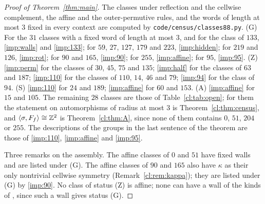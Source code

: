 \begin{proof}[Proof of Theorem~\ref{thm:main}]
The classes under reflection and the cellwise complement, the affine and the outer-permutive rules, and the words of length at most $3$ fixed in every context are computed by \texttt{code/census/classes88.py}. (G) For the $31$ classes with a fixed word of length at most $3$, and for the class of $133$, \eqref{imp:walls} and \eqref{imp:133}; for $59$, $27$, $127$, $179$ and $223$, \eqref{imp:hidden}; for $219$ and $126$, \eqref{imp:rot}; for $90$ and $165$, \eqref{imp:90}; for $255$, \eqref{imp:affine}; for $95$, \eqref{imp:95}. (Z) \eqref{imp:perm} for the classes of $30$, $45$, $75$ and $135$; \eqref{imp:half} for the classes of $63$ and $187$; \eqref{imp:110} for the classes of $110$, $14$, $46$ and $79$; \eqref{imp:94} for the class of $94$. (S) \eqref{imp:110} for $24$ and $189$; \eqref{imp:affine} for $60$ and $153$. (A) \eqref{imp:affine} for $15$ and $105$. The remaining $28$ classes are those of Table~\ref{cl:tab:open}; for them the statement on automorphisms of radius at most $3$ is Theorem~\ref{cl:thm:census}, and $\langle\sigma,F_f\rangle\cong\mathbb{Z}^2$ is Theorem~\ref{cl:thm:A}, since none of them contains $0$, $51$, $204$ or $255$. The descriptions of the groups in the last sentence of the theorem are those of \eqref{imp:110}, \eqref{imp:affine} and \eqref{imp:95}.

Three remarks on the assembly. The affine classes of $0$ and $51$ have fixed walls and are listed under (G). The affine classes of $90$ and $165$ also have $\kappa$ as their only nontrivial cellwise symmetry (Remark~\ref{cl:rem:kappa}); they are listed under (G) by \eqref{imp:90}. No class of status (Z) is affine; none can have a wall of the kinds of \cite{PaperC}, since such a wall gives status (G).
\end{proof}

